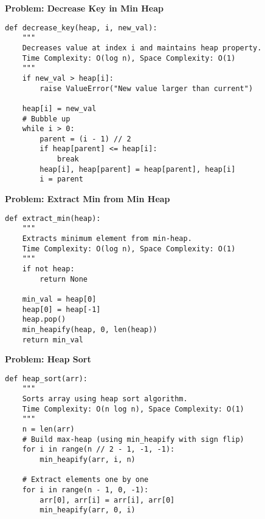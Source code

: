 \noindent\textbf{Problem: Decrease Key in Min Heap}
\begin{verbatim}
def decrease_key(heap, i, new_val):
    """
    Decreases value at index i and maintains heap property.
    Time Complexity: O(log n), Space Complexity: O(1)
    """
    if new_val > heap[i]:
        raise ValueError("New value larger than current")
    
    heap[i] = new_val
    # Bubble up
    while i > 0:
        parent = (i - 1) // 2
        if heap[parent] <= heap[i]:
            break
        heap[i], heap[parent] = heap[parent], heap[i]
        i = parent
\end{verbatim}

\noindent\textbf{Problem: Extract Min from Min Heap}
\begin{verbatim}
def extract_min(heap):
    """
    Extracts minimum element from min-heap.
    Time Complexity: O(log n), Space Complexity: O(1)
    """
    if not heap:
        return None
    
    min_val = heap[0]
    heap[0] = heap[-1]
    heap.pop()
    min_heapify(heap, 0, len(heap))
    return min_val
\end{verbatim}

\noindent\textbf{Problem: Heap Sort}
\begin{verbatim}
def heap_sort(arr):
    """
    Sorts array using heap sort algorithm.
    Time Complexity: O(n log n), Space Complexity: O(1)
    """
    n = len(arr)
    # Build max-heap (using min_heapify with sign flip)
    for i in range(n // 2 - 1, -1, -1):
        min_heapify(arr, i, n)
    
    # Extract elements one by one
    for i in range(n - 1, 0, -1):
        arr[0], arr[i] = arr[i], arr[0]
        min_heapify(arr, 0, i)
\end{verbatim}

